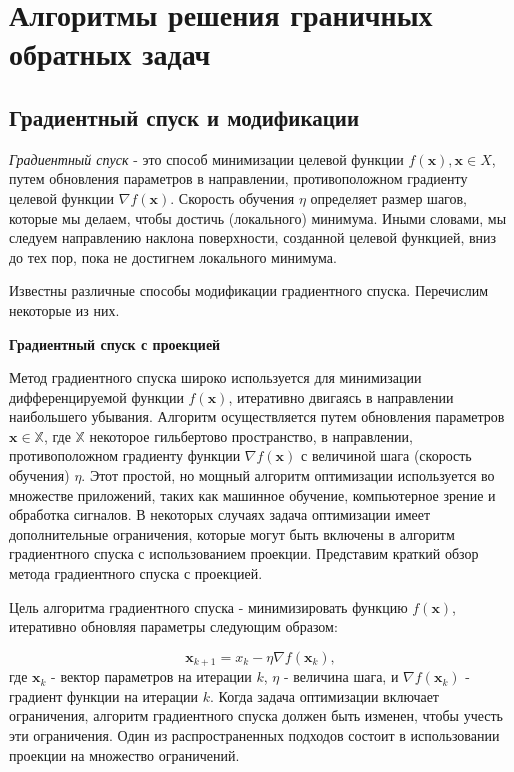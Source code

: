 \section{Алгоритмы решения граничных обратных задач}\label{sec:ch4/sec3}


\subsection{Градиентный спуск и модификации}
\label{subsec:ch4/sec3/grad}
\textit{Градиентный спуск} - это способ минимизации целевой функции
$f(\mathbf{x}), \mathbf{x} \in X$, путем обновления параметров
в направлении, противоположном градиенту целевой функции
$\nabla f(\mathbf{x})$.
Скорость обучения $\eta$ определяет размер шагов, которые мы делаем,
чтобы достичь (локального) минимума.
Иными словами, мы следуем направлению наклона поверхности,
созданной целевой функцией, вниз до тех пор,
пока не достигнем локального минимума.

Известны различные способы модификации градиентного спуска.
Перечислим некоторые из них.

\textbf{Градиентный спуск с проекцией}

Метод градиентного спуска широко используется для минимизации дифференцируемой
функции $f(\mathbf{x})$, итеративно двигаясь в направлении наибольшего убывания.
Алгоритм осуществляется путем обновления параметров
$\mathbf{x} \in \mathbb{X}$, где $\mathbb{X}$ некоторое гильбертово пространство,
в направлении, противоположном
градиенту функции $\nabla f(\mathbf{x})$ с величиной шага
(скорость обучения) $\eta$.
Этот простой, но мощный алгоритм оптимизации используется во
множестве приложений, таких как машинное обучение, компьютерное
зрение и обработка сигналов.
В некоторых случаях задача оптимизации
имеет дополнительные ограничения, которые могут быть включены в
алгоритм градиентного спуска с использованием проекции.
Представим краткий обзор метода градиентного спуска с проекцией.


Цель алгоритма градиентного спуска - минимизировать функцию
$f(\mathbf{x})$, итеративно обновляя параметры следующим образом:

\[ \mathbf{x}_{k+1} = x_k - \eta \nabla f(\mathbf{x}_k), \]
где $\mathbf{x}_k$ - вектор параметров на итерации $k$,
$\eta$ - величина шага, и $\nabla f(\mathbf{x}_k)$ - градиент
функции на итерации $k$.
Когда задача оптимизации включает ограничения, алгоритм
градиентного спуска должен быть изменен, чтобы учесть эти ограничения.
Один из распространенных подходов состоит в использовании проекции
на множество ограничений.


